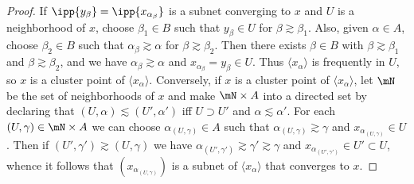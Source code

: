\documentclass[12pt,english]{article}
\begin{document}
\begin{proof}
    If $\ipp{y_\beta} = \ipp{x_{\alpha_\beta}}$ is a subnet converging to $x$ and $U$ is a neighborhood of $x$, choose $\beta_1 \in B$ such that $y_\beta \in U$ for $\beta \gtrsim \beta_1$. Also, given $\alpha \in A$, choose $\beta_2 \in B$ such that $\alpha_\beta \gtrsim \alpha$ for $\beta \gtrsim \beta_2$. 
Then there exists $\beta \in B$ with $\beta \gtrsim \beta_1$ and $\beta \gtrsim \beta_2$, and we have $\alpha_\beta \gtrsim \alpha$ and $x_{\alpha_\beta} = y_\beta \in U$. Thus $\langle x_\alpha \rangle$ is frequently in $U$, so $x$ is a cluster point of $\langle x_\alpha \rangle$. 
Conversely, if $x$ is a cluster point of $\langle x_\alpha \rangle$, let $\mN$ be the set of neighborhoods of $x$ and make $\mN \times A$ into a directed set by declaring that $(U, \alpha) \lesssim (U', \alpha')$ iff $U \supset U'$ and $\alpha \lesssim \alpha'$. 
For each $(U, \gamma) \in \mN \times A$ we can choose $\alpha_{(U, \gamma)} \in A$ such that $\alpha_{(U, \gamma)} \gtrsim \gamma$ and $x_{\alpha_{(U, \gamma)}} \in U$. Then if $(U', \gamma') \gtrsim (U, \gamma)$ we have $\alpha_{(U', \gamma')} \gtrsim \gamma' \gtrsim \gamma$ and $x_{\alpha_{(U', \gamma')}} \in U' \subset U$, whence it follows that $(x_{\alpha_{(U, \gamma)}})$ is a subnet of $\langle x_\alpha \rangle$ that converges to $x$. 
\end{proof}
\end{document}
